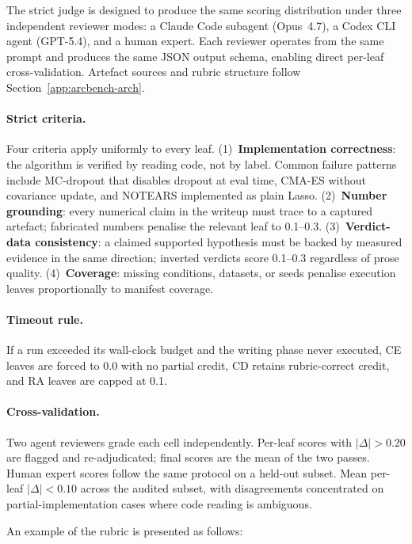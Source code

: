 The strict judge is designed to produce the same scoring distribution under three independent reviewer modes: a Claude Code subagent (Opus~4.7), a Codex CLI agent (GPT-5.4), and a human expert.
Each reviewer operates from the same prompt and produces the same JSON output schema, enabling direct per-leaf cross-validation.
Artefact sources and rubric structure follow Section~\ref{app:arcbench-arch}.

\paragraph{Strict criteria.}
Four criteria apply uniformly to every leaf.
(1)~\textbf{Implementation correctness}: the algorithm is verified by reading code, not by label.
Common failure patterns include MC-dropout that disables dropout at eval time, CMA-ES without covariance update, and NOTEARS implemented as plain Lasso.
(2)~\textbf{Number grounding}: every numerical claim in the writeup must trace to a captured artefact; fabricated numbers penalise the relevant leaf to 0.1--0.3.
(3)~\textbf{Verdict-data consistency}: a claimed supported hypothesis must be backed by measured evidence in the same direction; inverted verdicts score 0.1--0.3 regardless of prose quality.
(4)~\textbf{Coverage}: missing conditions, datasets, or seeds penalise execution leaves proportionally to manifest coverage.

\paragraph{Timeout rule.}
If a run exceeded its wall-clock budget and the writing phase never executed, CE leaves are forced to 0.0 with no partial credit, CD retains rubric-correct credit, and RA leaves are capped at 0.1.

\paragraph{Cross-validation.}
Two agent reviewers grade each cell independently.
Per-leaf scores with $|\Delta| > 0.20$ are flagged and re-adjudicated; final scores are the mean of the two passes.
Human expert scores follow the same protocol on a held-out subset.
Mean per-leaf $|\Delta| < 0.10$ across the audited subset, with disagreements concentrated on partial-implementation cases where code reading is ambiguous.

An example of the rubric is presented as follows:


